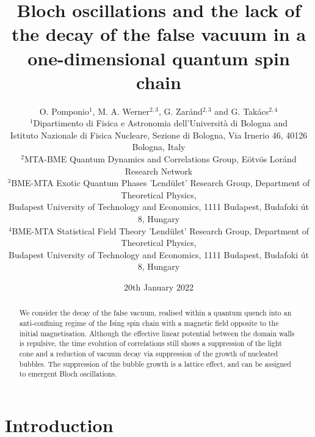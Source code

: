 \documentclass[amsmath,amssymb,11pt]{article}
\numberwithin{equation}{section}
\numberwithin{figure}{section}
\numberwithin{table}{section}
\begin{document}
\title{Bloch oscillations and the lack of the decay of the false vacuum in a one-dimensional quantum spin chain}
\author{O. Pomponio$^{1}$, M. A. Werner$^{2,3}$, G. Zar{\'a}nd$^{2,3}$ and G. Tak{\'a}cs$^{2,4}$\\
$^{1}${\small{}{}{}Dipartimento di Fisica e Astronomia dell\textquoteright Università di Bologna and }\\
 {\small{}{}{}Istituto Nazionale di Fisica Nucleare, Sezione di Bologna, Via Irnerio 46, 40126 Bologna, Italy}\\
$^{2}${\small{}{}{}MTA-BME Quantum Dynamics and Correlations Group,  E{\"o}tv{\"o}s Lor{\'a}nd Research Network}\\
$^{3}${\small{}{}{}BME-MTA Exotic Quantum Phases ’Lend\"ulet’ Research Group, Department of Theoretical Physics}, \\ 
{\small{}{}{}Budapest University of Technology and Economics, 1111 Budapest, Budafoki {\'u}t 8, Hungary}\\
$^{4}${\small{}{}{}BME-MTA Statistical Field Theory ’Lend\"ulet’ Research Group, Department of Theoretical Physics}, \\ 
{\small{}{}{}Budapest University of Technology and Economics, 1111 Budapest, Budafoki {\'u}t 8, Hungary}
}
\date{20th January 2022}
\maketitle

\begin{abstract}
We consider the decay of the false vacuum,  realised within a quantum quench into an anti-confining regime of the Ising spin chain with a magnetic field opposite to the initial magnetisation.  Although the effective linear potential between the domain walls is repulsive, the time evolution of correlations still shows a suppression of the light cone and a reduction of vacuum decay {via suppression of the growth of nucleated bubbles. The suppression of the bubble growth is a lattice effect, and can be assigned to emergent Bloch oscillations.}
\end{abstract}

\section{Introduction}
\end{document}

